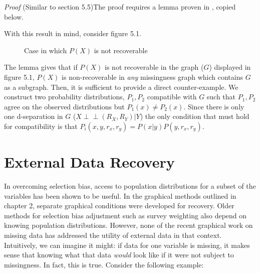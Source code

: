 \documentclass[12pt,twoside]{reedthesis}
\theoremstyle{definition}
\newcommand{\dsep}{\perp \!\!\!\perp}
\begin{document}
\emph{Proof} (Similar to  \cite{Mohan_2013} section 5.5)The proof requires a lemma proven in \cite{Mohan_2013}, copied below.


With this result in mind, consider figure 5.1.

\begin{figure}
\centering
{}
\caption{Case in which $P(X)$ is not recoverable} \label{fig:NonRec}
\end{figure}

The lemma gives that if $P(X)$ is not recoverable in the graph ($G$) displayed in figure 5.1, $P(X)$ is non-recoverable in \emph{any} missingness graph which contains $G$ as a subgraph. Then, it is sufficient to provide a direct counter-example. We construct two probability distributions, $P_1, P_2$ compatible with $G$ such that $P_1, P_2$ agree on the observed distributions but $P_1(x) \neq P_2(x)$. Since there is only one d-separation in $G$ ($X \dsep (R_X, R_Y) | Y$) the only condition that must hold for compatibility is that $P_i(x, y, r_x, r_y) = P(x | y)P(y, r_x, r_y)$.  


\section{External Data Recovery}

In overcoming selection bias,  access to population distributions for a subset of the variables has been shown to be useful. In the graphical methods outlined in chapter 2, separate graphical conditions were developed for recovery. Older methods for selection bias adjustment such as survey weighting also depend on knowing population distributions. However, none of the recent graphical work on missing data has addressed the utility of external data in that context. Intuitively, we can imagine it might: if data for one variable is missing, it makes sense that knowing what that data \emph{would} look like if it were not subject to missingness. In fact, this is true. Consider the following example:
\end{document}
